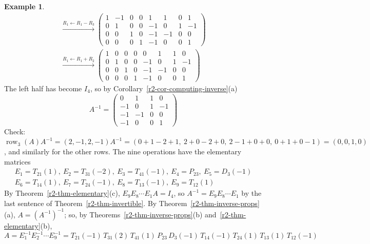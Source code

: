 \documentclass[12pt]{article}
\DeclareMathOperator{\row}{row}
\theoremstyle{definition}
\newtheorem{example}[theorem]{Example}
\begin{document}
\begin{example}
\[\begin{gathered}
\xrightarrow{R_1\leftarrow R_1-R_3}
\left(\begin{array}{cccc|cccc}1&-1&0&0&1&1&0&1\\0&1&0&0&-1&0&1&-1\\0&0&1&0&-1&-1&0&0\\0&0&0&1&-1&0&0&1\end{array}\right)
\\
\xrightarrow{R_1\leftarrow R_1+R_2}
\left(\begin{array}{cccc|cccc}1&0&0&0&0&1&1&0\\0&1&0&0&-1&0&1&-1\\0&0&1&0&-1&-1&0&0\\0&0&0&1&-1&0&0&1\end{array}\right)
\end{gathered}
\]
The left half has become \(I_4\), so by Corollary~\ref{r2-cor-computing-inverse}(a)
\[
A^{-1}=\begin{pmatrix}0&1&1&0\\-1&0&1&-1\\-1&-1&0&0\\-1&0&0&1\end{pmatrix}
\]
Check: \(\row_3(A)A^{-1}=(2,-1,2,-1)A^{-1}=(0+1-2+1,\ 2+0-2+0,\ 2-1+0+0,\ 0+1+0-1)=(0,0,1,0)\),
and similarly for the other rows. The nine operations have the elementary matrices
\[
\begin{gathered}
E_1=T_{21}(1),\ E_2=T_{31}(-2),\ E_3=T_{41}(-1),\ E_4=P_{23},\ E_5=D_3(-1)\\
E_6=T_{14}(1),\ E_7=T_{24}(-1),\ E_8=T_{13}(-1),\ E_9=T_{12}(1)
\end{gathered}
\]
By Theorem~\ref{r2-thm-elementary}(c), \(E_9E_8\cdots E_1A=I_4\), so \(A^{-1}=E_9E_8\cdots E_1\) by the last
sentence of Theorem~\ref{r2-thm-invertible}. By Theorem~\ref{r2-thm-inverse-props}(a), \(A=(A^{-1})^{-1}\); so, by
Theorems~\ref{r2-thm-inverse-props}(b) and~\ref{r2-thm-elementary}(b),
\[
A=E_1^{-1}E_2^{-1}\cdots E_9^{-1}
=T_{21}(-1)\,T_{31}(2)\,T_{41}(1)\,P_{23}\,D_3(-1)\,T_{14}(-1)\,T_{24}(1)\,T_{13}(1)\,T_{12}(-1)
\]
\end{example}
\end{document}

